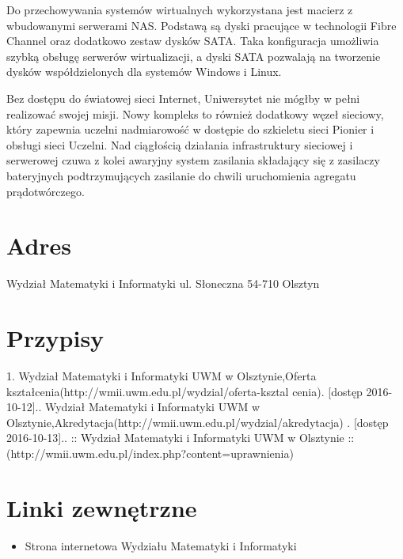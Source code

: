 ﻿\documentclass[a4paper,12pt]{article}
\begin{document}
Do przechowywania systemów wirtualnych wykorzystana jest macierz z wbudowanymi serwerami NAS.
Podstawą są dyski pracujące w technologii Fibre Channel oraz dodatkowo zestaw dysków SATA. Taka
konfiguracja umożliwia szybką obsługę serwerów wirtualizacji, a dyski SATA pozwalają na tworzenie dysków
współdzielonych dla systemów Windows i Linux.
\par Bez dostępu do światowej sieci Internet, Uniwersytet nie mógłby w pełni realizować swojej misji. Nowy
kompleks to również dodatkowy węzeł sieciowy, który zapewnia uczelni nadmiarowość w dostępie do
szkieletu sieci Pionier i obsługi sieci Uczelni. Nad ciągłością działania infrastruktury sieciowej i serwerowej
czuwa z kolei awaryjny system zasilania składający się z zasilaczy bateryjnych podtrzymujących zasilanie do
chwili uruchomienia agregatu prądotwórczego.
\section { Adres}
Wydział Matematyki i Informatyki\newline
ul. Słoneczna 54-710 Olsztyn
\section { Przypisy}
1. Wydział Matematyki i Informatyki UWM w Olsztynie,\newline Oferta kształcenia\newline (http://wmii.uwm.edu.pl/wydzial/oferta-ksztal
cenia). [dostęp 2016-10-12].. Wydział Matematyki i Informatyki UWM w Olsztynie,\newline Akredytacja\newline (http://wmii.uwm.edu.pl/wydzial/akredytacja) .
[dostęp 2016-10-13].. :: Wydział Matematyki i Informatyki UWM w Olsztynie ::\newline (http://wmii.uwm.edu.pl/index.php?content=uprawnienia)
\section { Linki zewnętrzne}
\begin{itemize}
\item Strona internetowa Wydziału Matematyki i Informatyki
\end{itemize}
\end{document}
